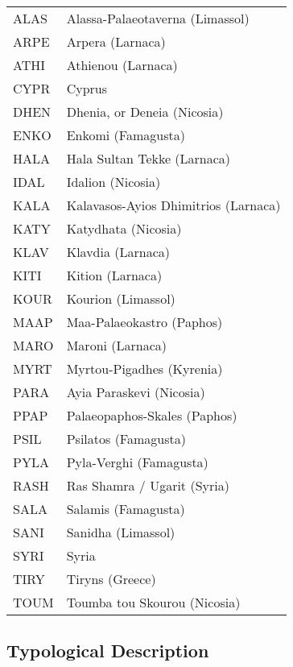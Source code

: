 \begin{longtable}[l]{>{\ttfamily}ll}
ALAS &Alassa-Palaeotaverna (Limassol)\\
ARPE &Arpera (Larnaca)\\
ATHI &Athienou (Larnaca)\\
CYPR &Cyprus\\
DHEN &Dhenia, or Deneia (Nicosia)\\
ENKO &Enkomi (Famagusta)\\
HALA &Hala Sultan Tekke (Larnaca)\\
IDAL &Idalion (Nicosia)\\
KALA &Kalavasos-Ayios Dhimitrios (Larnaca)\\
KATY &Katydhata (Nicosia)\\
KLAV &Klavdia (Larnaca)\\
KITI &Kition (Larnaca)\\
KOUR &Kourion (Limassol)\\
MAAP &Maa-Palaeokastro (Paphos)\\
MARO &Maroni (Larnaca)\\
MYRT &Myrtou-Pigadhes (Kyrenia)\\
PARA &Ayia Paraskevi (Nicosia)\\
PPAP &Palaeopaphos-Skales (Paphos)\\
PSIL &Psilatos (Famagusta)\\
PYLA &Pyla-Verghi (Famagusta)\\
RASH &Ras Shamra / Ugarit (Syria)\\
SALA &Salamis (Famagusta)\\
SANI &Sanidha (Limassol)\\
SYRI &Syria\\
TIRY &Tiryns (Greece)\\
TOUM &Toumba tou Skourou (Nicosia)\\
\end{longtable}

\subsection{Typological Description}


